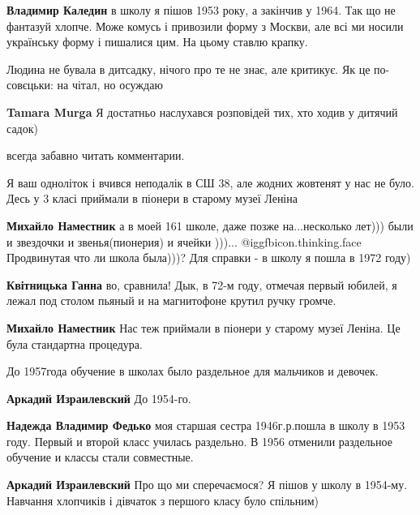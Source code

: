 \begin{itemize}
\begin{itemize}
\textbf{Владимир Каледин} в школу я пішов 1953 року, а закінчив у 1964. Так що не фантазуй хлопче. Може комусь і привозили форму з Москви, але всі ми носили українську форму і пишалися цим. На цьому ставлю крапку.
\end{itemize} %

Людина не бувала в дитсадку, нічого про те не знає, але критикує. Як це по-совєцьки: на чітал, но осуждаю

\textbf{Tamara Murga} Я достатньо наслухався розповідей тих, хто ходив у дитячий садок)

всегда забавно читать комментарии.


Я ваш одноліток і вчився неподалік в СШ 38, але жодних жовтенят у нас не було.
Десь у 3 класі приймали в піонери в старому музеї Леніна

\begin{itemize} %
\textbf{Михайло Наместник} а в моей 161 школе, даже позже на...несколько лет))) были и звездочки и звенья(пионерия) и ячейки )))...
 @igg{fbicon.thinking.face} Продвинутая что ли школа была)))?
Для справки - в школу я пошла в 1972 году)

\textbf{Квітницька Ганна} во, сравнила! Дык, в 72-м году, отмечая первый юбилей, я лежал под столом пьяный и на магнитофоне крутил ручку громче.

\textbf{Михайло Наместник} Нас теж приймали в піонери у старому музеї Леніна. Це була стандартна процедура.
\end{itemize} %

До 1957года обучение в школах было раздельное для мальчиков и девочек.

\begin{itemize} %
\textbf{Аркадий Израилевский} До 1954-го.

\begin{itemize} %
\textbf{Надежда Владимир Федько} моя старшая сестра 1946г.р.пошла в школу в 1953 году. Первый и второй класс училась раздельно. В 1956 отменили раздельное обучение и классы стали совместные.

\textbf{Аркадий Израилевский} Про що ми сперечаємося? Я пішов у школу в 1954-му. Навчання хлопчиків і дівчаток з першого класу було спільним)


\end{itemize}
\end{itemize}
\end{itemize}
